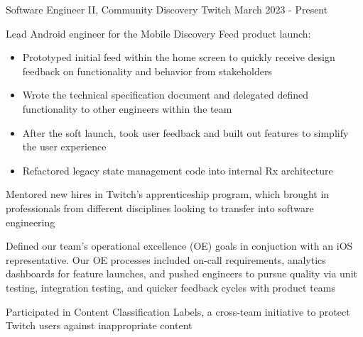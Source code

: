 

\begin{cventries}


  \cventry
    {Software Engineer II, Community Discovery} %
    {Twitch} %
    {} %
    {March 2023 - Present} %
    {
    \begin{cvitems} %
    \item { Lead Android engineer for the Mobile Discovery Feed product launch: 
        \begin{itemize}
            \item Prototyped initial feed within the home screen to quickly receive design feedback on functionality and behavior from stakeholders
            \item Wrote the technical specification document and delegated defined functionality to other engineers within the team
            \item After the soft launch, took user feedback and built out features to simplify the user experience
            \item Refactored legacy state management code into internal Rx architecture
        \end{itemize}}
    \item Mentored new hires in Twitch's apprenticeship program, which brought in professionals from different disciplines looking to transfer into software engineering
    \item Defined our team's operational excellence (OE) goals in conjuction with an iOS representative. Our OE processes included on-call requirements, analytics dashboards for feature launches, and pushed engineers to pursue quality via unit testing, integration testing, and quicker feedback cycles with product teams
    \item Participated in Content Classification Labels, a cross-team initiative to protect Twitch users against inappropriate content
    \end{cvitems}
    }


\end{cventries}
